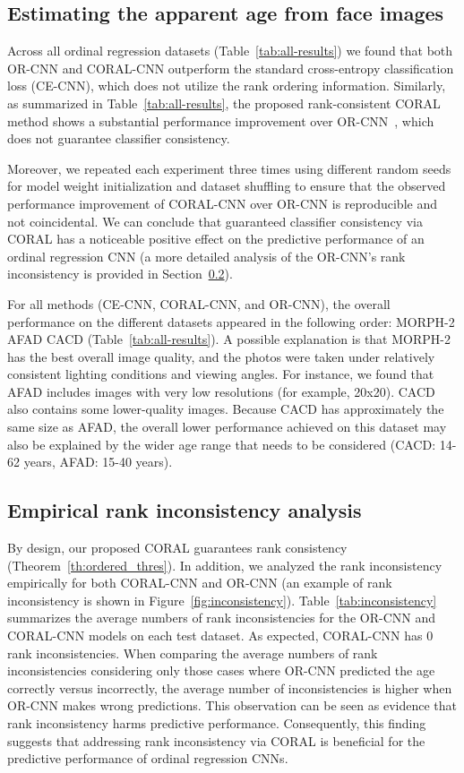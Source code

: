 \documentclass[times,twocolumn,final,authoryear]{elsarticle}
\begin{document}
\subsection{Estimating the apparent age from face images}


Across all ordinal regression datasets (Table~\ref{tab:all-results})
we found that both OR-CNN and CORAL-CNN outperform the standard cross-entropy classification loss (CE-CNN), which does not utilize the rank ordering information. Similarly, as summarized in Table~\ref{tab:all-results}, the proposed rank-consistent CORAL method shows a substantial performance improvement over OR-CNN~\citep{niu2016ordinal}, which does not guarantee classifier consistency.

Moreover, we repeated each experiment three times using different random seeds for model weight initialization and dataset shuffling to ensure that the observed performance improvement of CORAL-CNN over OR-CNN is reproducible and not coincidental. We can conclude that guaranteed classifier consistency via CORAL has a noticeable positive effect on the predictive performance of an ordinal regression CNN (a more detailed analysis of the OR-CNN's rank inconsistency is provided in Section~\ref{sec:inconsistencies}).

For all methods (CE-CNN, CORAL-CNN, and OR-CNN), the overall performance on the different datasets appeared in the following order: MORPH-2  AFAD  CACD (Table~\ref{tab:all-results}). A possible explanation is that MORPH-2 has the best overall image quality, and the photos were taken under relatively consistent lighting conditions and viewing angles. For instance, we found that AFAD includes images with very low resolutions (for example, 20x20). CACD also contains some lower-quality images. Because CACD has approximately the same size as AFAD, the overall lower performance achieved on this dataset may also be explained by the wider age range that needs to be considered (CACD: 14-62 years, AFAD: 15-40 years).


\subsection{Empirical rank inconsistency analysis}
\label{sec:inconsistencies}

By design, our proposed CORAL guarantees rank consistency (Theorem~\ref{th:ordered_thres}). In addition, we analyzed the rank inconsistency empirically for both CORAL-CNN and OR-CNN (an example of rank inconsistency is shown in Figure~\ref{fig:inconsistency}). Table~\ref{tab:inconsistency} summarizes the average numbers of rank inconsistencies for the OR-CNN and CORAL-CNN models on each test dataset. As expected, CORAL-CNN has 0 rank inconsistencies. When comparing the average numbers of rank inconsistencies considering only those cases where OR-CNN predicted the age correctly versus incorrectly, the average number of inconsistencies is higher when OR-CNN makes wrong predictions. This observation can be seen as evidence that rank inconsistency harms predictive performance. Consequently, this finding suggests that addressing rank inconsistency via CORAL is beneficial for the predictive performance of ordinal regression CNNs.
\end{document}
